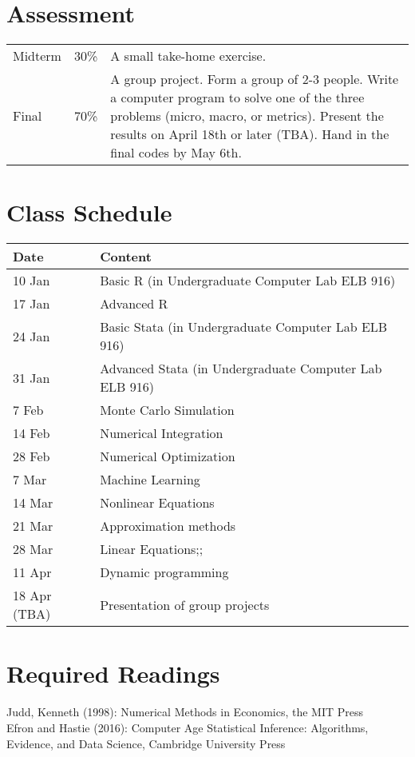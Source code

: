 \documentclass[11pt]{article}
\begin{document}
\section{Assessment}
\begin{tabular}{p{0.5in}p{0.5in}p{5in}}
   Midterm & 30\% & A small take-home exercise. \\
   Final  & 70\%  & A group project. Form a group of 2-3 people. Write a computer program to solve one of the three problems (micro, macro, or metrics). Present the results on April 18th or later (TBA). Hand in the final codes by May 6th.
\end{tabular}

\section{Class Schedule}
\begin{tabular}{p{1in}p{4in}}
  \hline
  Date & Content \\
  \hline
  10 Jan & Basic R (in Undergraduate Computer Lab ELB 916) \\
  17 Jan & Advanced R \\
  24 Jan & Basic Stata (in Undergraduate Computer Lab ELB 916) \\
  31 Jan & Advanced Stata (in Undergraduate Computer Lab ELB 916)  \\
  7 Feb &  Monte Carlo Simulation\\
  14 Feb & Numerical Integration \\
  28 Feb & Numerical Optimization  \\
  7 Mar &  Machine Learning  \\
  14 Mar &  Nonlinear Equations \\
  21 Mar & Approximation methods \\
  28 Mar & Linear Equations;;  \\
  11 Apr & Dynamic programming \\
  18 Apr (TBA) & Presentation of group projects \\
  \hline
\end{tabular}





\section{Required Readings}
Judd, Kenneth (1998): Numerical Methods in Economics, the MIT Press \\
Efron and Hastie (2016): Computer Age Statistical Inference: Algorithms, Evidence, and Data Science, Cambridge University Press
\end{document}
